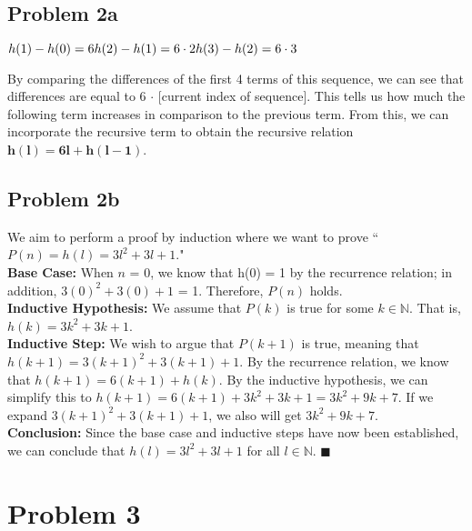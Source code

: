 \documentclass{article}
\begin{document}
\subsection{Problem 2a}

\begin{math}
h(1) - h(0) = 6 \\ 
h(2) - h(1) = 6 \cdot 2 \\
h(3) - h(2) = 6 \cdot 3 \\
\end{math}

By comparing the differences of the first 4 terms of this sequence, we can see that differences are equal to 6 $\cdot$ [current index of sequence]. This tells us how much the following term increases in comparison to the previous term. From this, we can incorporate the recursive term to obtain the recursive relation $\mathbf{h(l) = 6l + h(l-1)}$. \\

\subsection{Problem 2b}

We aim to perform a proof by induction where we want to prove “$P(n) = h(l) = 3l^2+3l+1$." \\

\textbf{Base Case:} When $n$ = 0, we know that h(0) = 1 by the recurrence relation; in addition, $3(0)^2 + 3(0) + 1$ = 1. Therefore, $P(n)$ holds.\\

\textbf{Inductive Hypothesis:} We assume that $P(k)$ is true for some $k \in \mathbb{N}$. That is, $h(k) = 3k^2+3k+1$. \\

\textbf{Inductive Step:} We wish to argue that $P(k+1)$ is true, meaning that $h(k+1) = 3(k+1)^2+3(k+1)+1$. By the recurrence relation, we know that $h(k+1) = 6(k+1) + h(k)$. By the inductive hypothesis, we can simplify this to $h(k+1) = 6(k+1) + 3k^2  + 3k + 1 = 3k^2 + 9k + 7$. If we expand $3(k+1)^2+3(k+1)+1$, we also will get $3k^2 + 9k + 7$. \\

\textbf{Conclusion:} Since the base case and inductive steps have now been established, we can conclude that $h(l) = 3l^2+3l+1$ for all $l \in \mathbb{N}$. $\blacksquare$

\section{Problem 3}
\end{document}

